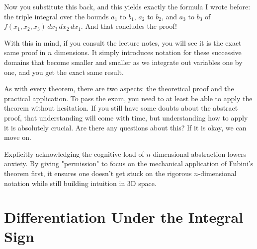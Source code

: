 
\begin{spoken-clean}[00:30:32 - 00:32:44]
Now you substitute this back, and this yields exactly the formula I wrote before: the triple integral over the bounds $a_1$ to $b_1$, $a_2$ to $b_2$, and $a_3$ to $b_3$ of $f(x_1, x_2, x_3) \, dx_3 \, dx_2 \, dx_1$. And that concludes the proof! 

With this in mind, if you consult the lecture notes, you will see it is the exact same proof in $n$ dimensions. It simply introduces notation for these successive domains that become smaller and smaller as we integrate out variables one by one, and you get the exact same result.

As with every theorem, there are two aspects: the theoretical proof and the practical application. To pass the exam, you need to at least be able to apply the theorem without hesitation. If you still have some doubts about the abstract proof, that understanding will come with time, but understanding how to apply it is absolutely crucial. Are there any questions about this? If it is okay, we can move on.
\end{spoken-clean}

\begin{didactic-insight}
Explicitly acknowledging the cognitive load of $n$-dimensional abstraction lowers anxiety. By giving "permission" to focus on the mechanical application of Fubini's theorem first, it ensures one doesn't get stuck on the rigorous $n$-dimensional notation while still building intuition in 3D space.
\end{didactic-insight}



\section{Differentiation Under the Integral Sign}

